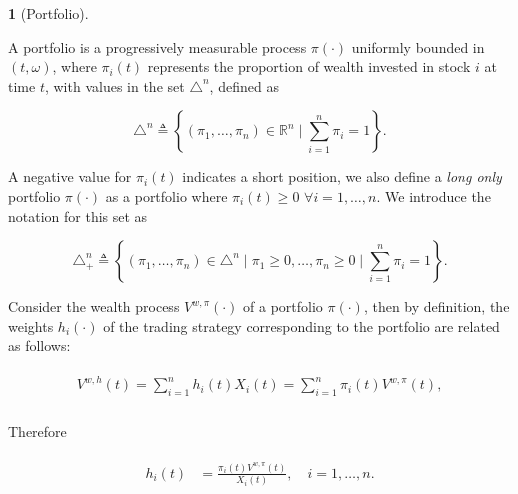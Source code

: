 \documentclass[british]{amsart} \usepackage{lmodern}
\numberwithin{equation}{section} \numberwithin{figure}{section}
\theoremstyle{plain} \newtheorem{thm}{\protect\theoremname}[section]
\theoremstyle{definition} \newtheorem{defn}[thm]{\protect\definitionname}
\theoremstyle{plain} \newtheorem{assumption}[thm]{\protect\assumptionname}
\theoremstyle{plain} \newtheorem{lem}[thm]{\protect\lemmaname}
\theoremstyle{plain} \newtheorem{prop}[thm]{\protect\propositionname}
\theoremstyle{remark} \newtheorem{rem}[thm]{\protect\remarkname}
\theoremstyle{plain} \newtheorem{cor}[thm]{\protect\corollaryname}
\newcommand{\defeq}{\mathop{\triangleq}} \newcommand{\almostsurely}{\text{a.s.}}
\newcommand{\rangei}{i=1,\dots,n} \newcommand{\measure}{\mathbb{P}}
\newcommand{\V}{V^{w,\pi}}
\begin{document}
\begin{defn} [Portfolio]
  \label{def:portfolio}

  A portfolio is a progressively measurable process $\pi(\cdot)$ uniformly
  bounded in $(t,\omega)$, where $\pi_{i}(t)$ represents the proportion of wealth
  invested in stock $i$ at time $t$, with values in the set $\triangle^{n}$,
  defined as 

  \begin{equation*}
    \triangle^{n} \defeq 
    \left\{
          (\pi_{1}, \dots, \pi_{n}) \in \mathbb{R}^{n} 
          \mid
          \sum_{i=1}^{n} \pi_{i} = 1
    \right\}.
  \end{equation*}

  A negative value for $\pi_{i}(t)$ indicates a short position, we also define a
  \textit{long only} portfolio $\pi(\cdot)$ as a portfolio where $\pi_{i}(t) \ge
  0$ $\forall \rangei$. We introduce the notation for this set as

  \begin{equation*}
    \triangle_{+}^{n} \defeq 
    \left\{
          (\pi_{1}, \dots, \pi_{n}) \in \triangle^{n} 
          \mid
          \pi_{1} \ge 0, \dots, \pi_{n} \ge 0
          \mid
          \sum_{i=1}^{n} \pi_{i} = 1
    \right\}.
  \end{equation*}

\end{defn}

Consider the wealth process $\V(\cdot)$ of a portfolio $\pi(\cdot)$, then by
definition, the weights $h_{i}(\cdot)$ of the trading strategy corresponding to
the portfolio are related as follows:

\begin{gather}
  \begin{split}
    V^{w,h}(t) =\sum_{i=1}^{n} h_i(t)X_{i}(t) = \sum_{i=1}^{n}
                    \pi_{i}(t)V^{w,\pi}(t), \\
  \end{split}
\end{gather}

Therefore

\begin{gather}
  \begin{split}
    \label{eq:wealthinvestedbyportfolio}
    h_i(t) &= \frac{\pi_{i}(t)V^{w,\pi}(t)}{X_{i}(t)},
    \quad \rangei.
  \end{split}
\end{gather}
\end{document}
